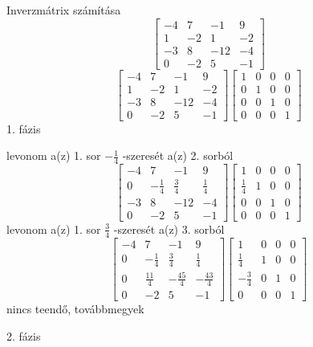 \documentclass[12pt]{article}
\begin{document}
Inverzmátrix számítása
$$\left[{\begin{array}{cccc}-4& 7& -1& 9\\ 1& -2& 1& -2\\ -3& 8& -12& -4\\ 0& -2& 5& -1\end{array}}\right]$$
$$\left[{\begin{array}{cccc}-4& 7& -1& 9\\ 1& -2& 1& -2\\ -3& 8& -12& -4\\ 0& -2& 5& -1\end{array}}\right]\left[{\begin{array}{cccc}1& 0& 0& 0\\ 0& 1& 0& 0\\ 0& 0& 1& 0\\ 0& 0& 0& 1\end{array}}\right]$$
1. fázis

levonom a(z) 1. sor $-\frac{1}{4}$ -szeresét a(z) 2. sorból
$$\left[{\begin{array}{cccc}-4& 7& -1& 9\\ 0& -\frac{1}{4}& \frac{3}{4}& \frac{1}{4}\\ -3& 8& -12& -4\\ 0& -2& 5& -1\end{array}}\right]\left[{\begin{array}{cccc}1& 0& 0& 0\\ \frac{1}{4}& 1& 0& 0\\ 0& 0& 1& 0\\ 0& 0& 0& 1\end{array}}\right]$$
levonom a(z) 1. sor $\frac{3}{4}$ -szeresét a(z) 3. sorból
$$\left[{\begin{array}{cccc}-4& 7& -1& 9\\ 0& -\frac{1}{4}& \frac{3}{4}& \frac{1}{4}\\ 0& \frac{11}{4}& -\frac{45}{4}& -\frac{43}{4}\\ 0& -2& 5& -1\end{array}}\right]\left[{\begin{array}{cccc}1& 0& 0& 0\\ \frac{1}{4}& 1& 0& 0\\ -\frac{3}{4}& 0& 1& 0\\ 0& 0& 0& 1\end{array}}\right]$$
nincs teendő, továbbmegyek

2. fázis
\end{document}
